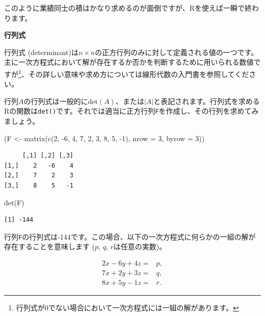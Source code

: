 \documentclass[
  a4paper,
  pandoc,
  ja=standard,
  jafont=haranoaji]{bxjsbook}
\newenvironment{Shaded}{\begin{snugshade}}{\end{snugshade}}
\newcommand{\AttributeTok}[1]{\textcolor[rgb]{0.00,0.48,0.65}{#1}}
\newcommand{\DecValTok}[1]{\textcolor[rgb]{0.68,0.00,0.00}{#1}}
\newcommand{\FunctionTok}[1]{\textcolor[rgb]{0.28,0.35,0.67}{#1}}
\newcommand{\NormalTok}[1]{\textcolor[rgb]{0.00,0.48,0.65}{#1}}
\newcommand{\OtherTok}[1]{\textcolor[rgb]{0.00,0.48,0.65}{#1}}
\newcommand{\SpecialCharTok}[1]{\textcolor[rgb]{0.37,0.37,0.37}{#1}}
\begin{document}
このように業績同士の積はかなり求めるのが面倒ですが、Rを使えば一瞬で終わります。

\textbf{行列式}

行列式
(determinant)は\(n \times n\)の正方行列のみに対して定義される値の一つです。主に一次方程式において解が存在するか否かを判断するために用いられる数値ですが\footnote{行列式が0でない場合において一次方程式には一組の解があります。}、その詳しい意味や求め方については線形代数の入門書を参照してください。

行列\(A\)の行列式は一般的に\(\text{det}(A)\)、または\(|A|\)と表記されます。行列式を求めるRの関数は\texttt{det()}です。それでは適当に正方行列\texttt{F}を作成し、その行列を求めてみましょう。

\begin{Shaded}
\begin{Highlighting}[numbers=left,,]
\NormalTok{(F }\OtherTok{\textless{}{-}} \FunctionTok{matrix}\NormalTok{(}\FunctionTok{c}\NormalTok{(}\DecValTok{2}\NormalTok{, }\SpecialCharTok{{-}}\DecValTok{6}\NormalTok{, }\DecValTok{4}\NormalTok{, }\DecValTok{7}\NormalTok{, }\DecValTok{2}\NormalTok{, }\DecValTok{3}\NormalTok{, }\DecValTok{8}\NormalTok{, }\DecValTok{5}\NormalTok{, }\SpecialCharTok{{-}}\DecValTok{1}\NormalTok{), }\AttributeTok{nrow =} \DecValTok{3}\NormalTok{, }\AttributeTok{byrow =} \DecValTok{3}\NormalTok{))}
\end{Highlighting}
\end{Shaded}

\begin{verbatim}
     [,1] [,2] [,3]
[1,]    2   -6    4
[2,]    7    2    3
[3,]    8    5   -1
\end{verbatim}

\begin{Shaded}
\begin{Highlighting}[numbers=left,,]
\FunctionTok{det}\NormalTok{(F)}
\end{Highlighting}
\end{Shaded}

\begin{verbatim}
[1] -144
\end{verbatim}

行列\texttt{F}の行列式は-144です。この場合、以下の一次方程式に何らかの一組の解が存在することを意味します
(\(p\), \(q\), \(r\)は任意の実数)。

\begin{align}
2x - 6y + 4z = & p, \\
7x + 2y + 3z = & q, \\
8x + 5y - 1z = & r.
\end{align}
\end{document}
